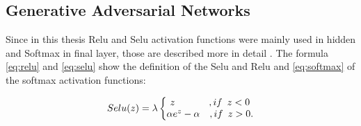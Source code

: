 \subsection{Generative Adversarial Networks}

Since in this thesis Relu and Selu activation functions were mainly used in hidden and Softmax in final layer, those are described more in detail . The formula \ref{eq:relu} and \ref{eq:selu} show the definition of the Selu and Relu and \ref{eq:softmax} of the softmax activation functions: 

\begin{equation}
Selu(z) = \lambda
\left\{
\begin{matrix}
z \hspace{3.5em}, if \enspace z < 0\\
\alpha e^{z} - \alpha  \hspace{1em}, if \enspace z > 0.
\end{matrix}
\right.
\label{eq:selu}
\end{equation}

